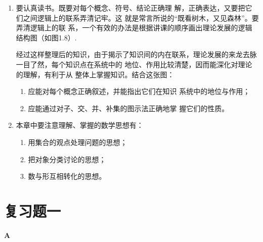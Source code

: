 \begin{enumerate}
    \item 要认真读书。既要对每个概念、符号、结论正确理
    解，正确表达，又要把它们之间逻辑上的联系弄清记牢。这
    就是常言所说的“既看树木，又见森林”。要弄清逻辑上的联
    系，一个有效的办法是根据讲课的顺序画出理论发展的逻辑
    结构图（如图1.8）.

    经过这样整理后的知识，由于揭示了知识间的内在联系，理论发展的来龙去脉一目了然，每个知识点在系统中的
地位、作用比较清楚，因而能深化对理论的理解，有利于从
整体上掌握知识。结合这张图：
\begin{enumerate}[(1)]
\item 应能对每个概念正确叙述，并能指出它们在知识
系统中的地位与作用；
\item 应能通过对子、交、并、补集的图示法正确地掌
握它们的性质。
\end{enumerate}

\item 本章中要注意理解、掌握的数学思想有：
\begin{enumerate}[(1)]
 \item 用集合的观点处理问题的思想；
\item 把对象分类讨论的思想；
\item 数与形互相转化的思想。  
\end{enumerate}
\end{enumerate}



\section*{复习题一}
\begin{center}
    \bfseries A
\end{center}

